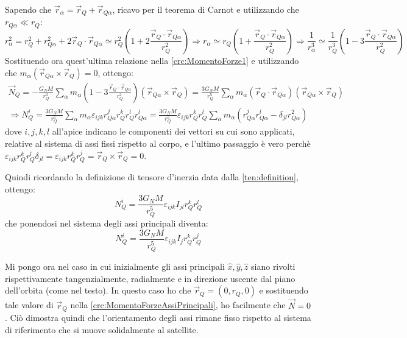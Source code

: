 \documentclass[../main.tex]{subfiles}
\begin{document}
Sapendo che $\vec r_\alpha=\vec r_Q+\vec r_{Q\alpha}$, ricavo per il teorema di Carnot e utilizzando che $r_{Q\alpha}\ll r_Q$:
\begin{equation*}
	r_\alpha^2=r_Q^2+r_{Q\alpha}^2+2\vec r_Q\cdot \vec r_{Q\alpha}\simeq r_Q^2 \left( 1+2\frac{\vec r_Q\cdot \vec r_{Q\alpha}}{r_Q^2} \right)
	\Longrightarrow  r_\alpha \simeq r_Q \left( 1+\frac{\vec r_Q\cdot \vec r_{Q\alpha}}{r_Q^2} \right) \Longrightarrow  \frac{1}{r_\alpha^3} \simeq \frac{1}{r_Q^3} \left( 1-3\frac{\vec r_Q\cdot \vec r_{Q\alpha}}{r_Q^2} \right)
\end{equation*}
Sostituendo ora quest'ultima relazione nella \cref{crc:MomentoForze1} e utilizzando che $m_\alpha(\vec r_{Q\alpha} \times \vec r_Q)=0$, ottengo:
\begin{gather*}
	\vec N_Q = -\frac{G_NM}{r_Q^3} \sum_\alpha m_\alpha\left( 1-3\frac{\vec r_Q\cdot \vec r_{Q\alpha}}{r_Q^2} \right) (\vec r_{Q\alpha} \times \vec r_Q) =  \frac{3G_N M}{r_Q^5} \sum_\alpha m_\alpha(\vec r_Q\cdot \vec r_{Q\alpha})( \vec r_{Q\alpha}\times \vec r_Q)\\
	\Longrightarrow N_Q^i =\frac{3G_N M}{r_Q^5} \sum_\alpha m_\alpha\varepsilon_{ijk}r_{Q\alpha}^jr_Q^k r_Q^lr_{Q\alpha}^l=\frac{3G_N M}{r_Q^5} \varepsilon_{ijk} r_Q^k r_Q^l\sum_\alpha m_\alpha (r_{Q\alpha}^jr_{Q\alpha}^l-\delta_{jl} r_{Q\alpha}^2)
\end{gather*}
dove $i,j,k,l$ all'apice indicano le componenti dei vettori su cui sono applicati, relative al sistema di assi fissi rispetto al corpo, e l'ultimo passaggio è vero perchè $\varepsilon_{ijk} r_Q^k r_Q^l \delta_{jl}=\varepsilon_{ijk} r_Q^k r_Q^j=\vec r_Q \times \vec r_Q =0$.

Quindi ricordando la definizione di tensore d'inerzia data dalla \cref{ten:definition}, ottengo:
\begin{equation}\label{crc:MomentoForze}
	N_Q^i=\frac{3G_N M}{r_Q^5} \varepsilon_{ijk} I_{jl} r_Q^k r_Q^l
\end{equation}
che ponendosi nel sistema degli assi principali diventa:
\begin{equation}\label{crc:MomentoForzeAssiPrincipali}
	N_Q^i=\frac{3G_N M}{r_Q^5} \varepsilon_{ijk} I_{j} r_Q^k r_Q^j
\end{equation}

Mi pongo ora nel caso in cui inizialmente gli assi principali $\hat x, \hat y, \hat z$ siano rivolti rispettivamente tangenzialmente, radialmente e in direzione uscente dal piano dell'orbita (come nel testo).
In questo caso ho che $\vec r_Q=(0,r_Q,0)$ e sostituendo tale valore di $\vec r_Q$ nella \cref{crc:MomentoForzeAssiPrincipali}, ho facilmente che $\vec N=0$. Ciò dimostra quindi che l'orientamento degli assi rimane fisso rispetto al sistema di riferimento che si muove solidalmente al satellite.
\end{document}
